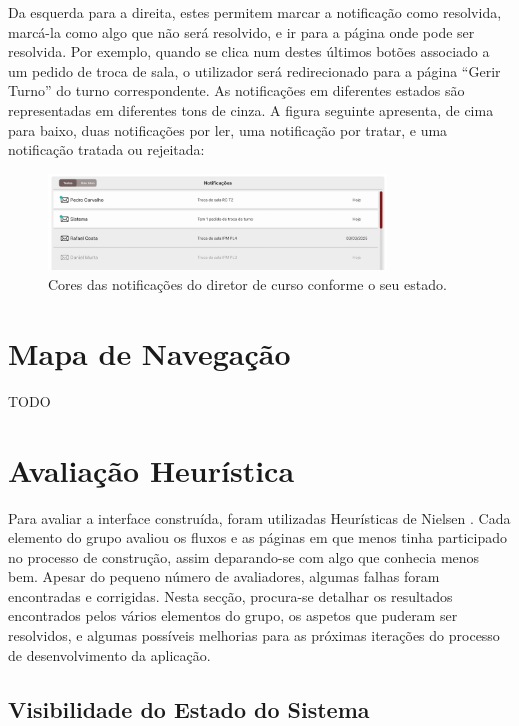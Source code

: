 \documentclass[12pt, a4paper]{article}
\begin{document}
Da esquerda para a direita, estes permitem marcar a notificação como resolvida, marcá-la como algo
que não será resolvido, e ir para a página onde pode ser resolvida. Por exemplo, quando se clica num
destes últimos botões associado a um pedido de troca de sala, o utilizador será redirecionado para a
página ``Gerir Turno'' do turno correspondente. As notificações em diferentes estados são
representadas em diferentes tons de cinza. A figura seguinte apresenta, de cima para baixo, duas
notificações por ler, uma notificação por tratar, e uma notificação tratada ou rejeitada:

\begin{figure}[H]
    \centering
    \includegraphics[width=0.8\textwidth]{res/prototype/notificacoes-diretor-cor.png}
    \caption{Cores das notificações do diretor de curso conforme o seu estado.}
    \label{notificacoes-diretor-cor}
\end{figure}

\section{Mapa de Navegação}

TODO

\section{Avaliação Heurística}

Para avaliar a interface construída, foram utilizadas Heurísticas de Nielsen \cite{nielsen}. Cada
elemento do grupo avaliou os fluxos e as páginas em que menos tinha participado no processo de
construção, assim deparando-se com algo que conhecia menos bem. Apesar do pequeno número de
avaliadores, algumas falhas foram encontradas e corrigidas. Nesta secção, procura-se detalhar os
resultados encontrados pelos vários elementos do grupo, os aspetos que puderam ser resolvidos, e
algumas possíveis melhorias para as próximas iterações do processo de desenvolvimento da aplicação.

\subsection{Visibilidade do Estado do Sistema}
\end{document}
